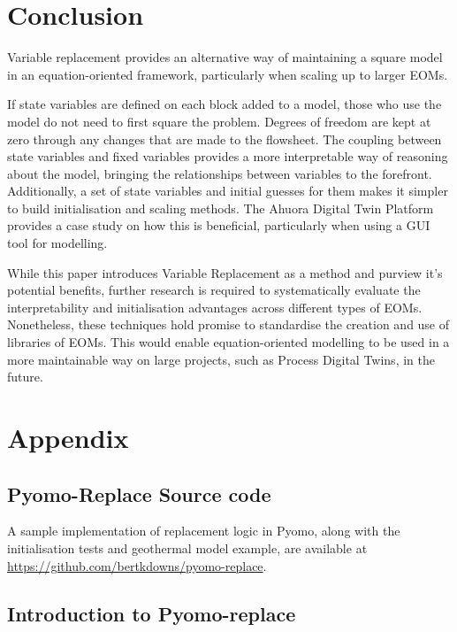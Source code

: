\hypertarget{conclusion}{%
\section{Conclusion}\label{conclusion}}

Variable replacement provides an alternative way of maintaining a square
model in an equation-oriented framework, particularly when scaling up to
larger EOMs.

If state variables are defined on each block added to a model, those who
use the model do not need to first square the problem. Degrees of
freedom are kept at zero through any changes that are made to the
flowsheet. The coupling between state variables and fixed variables
provides a more interpretable way of reasoning about the model, bringing
the relationships between variables to the forefront. Additionally, a
set of state variables and initial guesses for them makes it simpler to
build initialisation and scaling methods. The Ahuora Digital Twin
Platform provides a case study on how this is beneficial, particularly
when using a GUI tool for modelling.

While this paper introduces Variable Replacement as a method and purview
it's potential benefits, further research is required to systematically
evaluate the interpretability and initialisation advantages across
different types of EOMs. Nonetheless, these techniques hold promise to
standardise the creation and use of libraries of EOMs. This would enable
equation-oriented modelling to be used in a more maintainable way on
large projects, such as Process Digital Twins, in the future.


\hypertarget{appendix}{%
\section{Appendix}\label{appendix}}

\hypertarget{pyomo-replace-source-code}{%
\subsection{Pyomo-Replace Source code}\label{pyomo-replace-source-code}}

A sample implementation of replacement logic in Pyomo, along with the
initialisation tests and geothermal model example, are available at
\url{https://github.com/bertkdowns/pyomo-replace}.

\hypertarget{introduction-to-pyomo-replace}{%
\subsection{Introduction to
Pyomo-replace}\label{introduction-to-pyomo-replace}}

